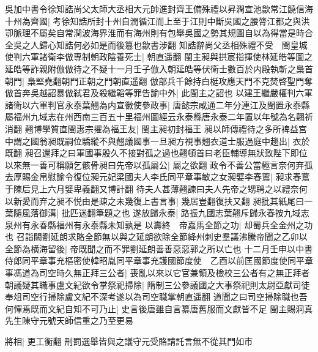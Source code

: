 吳加中書令徐知誥尚父太師大丞相大元帥進封齊王備殊禮以昇潤宣池歙常江饒信海十州為齊國|{
	考徐知誥所封十州自潤循江而上至于江則中斷吳國之腰膂江都之與洪卾脈理不屬矣自常潤波海界淮而有海州則有包舉吳國之勢其規圖自以為得當是時合全吳之人歸心知誥何必如是而後簒也歙書涉翻}
知誥辭尚父丞相殊禮不受　閩皇城使判六軍諸衛李倣專制朝政陰養死士|{
	朝直遥翻}
閩主昶與拱宸指揮使林延皓等圖之延皓等詐親附倣倣待之不疑十一月壬子倣入朝延皓等伏衛士數百於内殿執斬之梟首朝門|{
	梟堅堯翻朝門正朝之門朝直遥翻}
倣部兵千餘持白梃攻應天門不克焚啓聖門奪倣首奔吳越詔暴倣弑君及殺繼韜等罪告諭中外|{
	此閩主之詔也}
以建王繼嚴權判六軍諸衛以六軍判官永泰葉翹為内宣徽使參政事|{
	唐懿宗咸通二年分連江及閩置永泰縣屬福州九域志在州西南三百五十里福州圖經云永泰縣唐永泰二年置以年號為名翹祈消翻}
翹博學質直閩惠宗擢為福王友|{
	閩主昶初封福王}
昶以師傳禮待之多所禆益宫中謂之國翁昶既嗣位驕縱不與翹議國事一旦昶方視事翹衣道士服過庭中趨出|{
	衣於既翻}
昶召還拜之曰軍國事殷久不接對孤之過也翹頓首曰老臣輔導無狀致陛下即位以來無一善可稱願乞骸骨昶曰先帝以孤屬公|{
	屬之欲翻}
政令不善公當極言奈何弃孤去厚賜金帛慰諭令復位昶元妃梁國夫人李氏同平章事敏之女昶嬖李春鷰|{
	昶求春鷰于陳后見上六月嬖卑義翻又博計翻}
待夫人甚薄翹諫曰夫人先帝之甥聘之以禮奈何以新愛而弃之昶不悦由是疎之未幾復上書言事|{
	幾居豈翻復扶又翻}
昶批其紙尾曰一葉隨風落御溝|{
	批匹迷翻筆題之也}
遂放歸永泰|{
	路振九國志葉翹斥歸永春按九域志泉州有永春縣福州有永泰縣未知孰是}
以壽終　帝嘉馬全節之功|{
	却蜀兵全金州之功也}
召詣闕劉延朗求賂全節無以與之延朗欲除全節絳州刺史羣議沸騰帝聞之乙卯以全節為横海留後|{
	帝既聞之而不罪劉延朗善善惡惡郭之所以亡也}
十二月壬申以中書侍郎同平章事充樞密使韓昭胤同平章事充護國節度使　乙酉以前匡國節度使同平章事馮道為司空時久無正拜三公者|{
	喪亂以來以它官兼領及檢校三公者有之無正拜者}
朝議疑其職事盧文紀欲令掌祭祀掃除|{
	隋制三公參議國之大事祭祀則太尉亞獻司徒奉俎司空行掃除盧文紀不深考遂以為司空職掌朝直遥翻}
道聞之曰司空掃除職也吾何憚焉既而文紀自知不可乃止|{
	史言後唐雖自言纂唐舊服而文獻皆不足}
閩主賜洞真先生陳守元號天師信重之乃至更易

將相|{
	更工衡翻}
刑罰選舉皆與之議守元受賂請託言無不從其門如市

